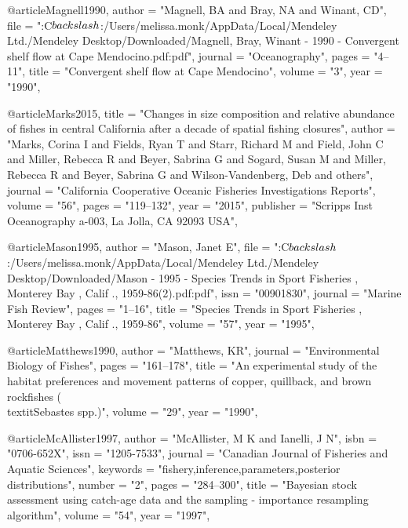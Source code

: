 @article{Magnell1990,
    author = "{Magnell, BA and Bray, NA and Winant, CD}",
    file = "{:C$\\backslash$:/Users/melissa.monk/AppData/Local/Mendeley Ltd./Mendeley Desktop/Downloaded/Magnell, Bray, Winant - 1990 - Convergent shelf flow at Cape Mendocino.pdf:pdf}",
    journal = "{Oceanography}",
    pages = "{4--11}",
    title = "{{Convergent shelf flow at Cape Mendocino}}",
    volume = "{3}",
    year = "{1990}",
}

@article{Marks2015,
    title = "{Changes in size composition and relative abundance of fishes in central California after a decade of spatial fishing closures}",
    author = "{Marks, Corina I and Fields, Ryan T and Starr, Richard M and Field, John C and Miller, Rebecca R and Beyer, Sabrina G and Sogard, Susan M and Miller, Rebecca R and Beyer, Sabrina G and Wilson-Vandenberg, Deb and others}",
    journal = "{California Cooperative Oceanic Fisheries Investigations Reports}",
    volume = "{56}",
    pages = "{119--132}",
    year = "{2015}",
    publisher = "{Scripps Inst Oceanography a-003, La Jolla, CA 92093 USA}",
}

@article{Mason1995,
    author = "{Mason, Janet E}",
    file = "{:C$\\backslash$:/Users/melissa.monk/AppData/Local/Mendeley Ltd./Mendeley Desktop/Downloaded/Mason - 1995 - Species Trends in Sport Fisheries , Monterey Bay , Calif ., 1959-86(2).pdf:pdf}",
    issn = "{00901830}",
    journal = "{Marine Fish Review}",
    pages = "{1--16}",
    title = "{{Species Trends in Sport Fisheries , Monterey Bay , Calif ., 1959-86}}",
    volume = "{57}",
    year = "{1995}",
}

@article{Matthews1990,
    author = "{Matthews, KR}",
    journal = "{Environmental Biology of Fishes}",
    pages = "{161--178}",
    title = "{{An experimental study of the habitat preferences and movement patterns of copper, quillback, and brown rockfishes (\\textit{{Sebastes}} spp.)}}",
    volume = "{29}",
    year = "{1990}",
}

@article{McAllister1997,
    author = "{McAllister, M K and Ianelli, J N}",
    isbn = "{0706-652X}",
    issn = "{1205-7533}",
    journal = "{Canadian Journal of Fisheries and Aquatic Sciences}",
    keywords = "{fishery,inference,parameters,posterior distributions}",
    number = "{2}",
    pages = "{284--300}",
    title = "{{Bayesian stock assessment using catch-age data and the sampling - importance resampling algorithm}}",
    volume = "{54}",
    year = "{1997}",
}

